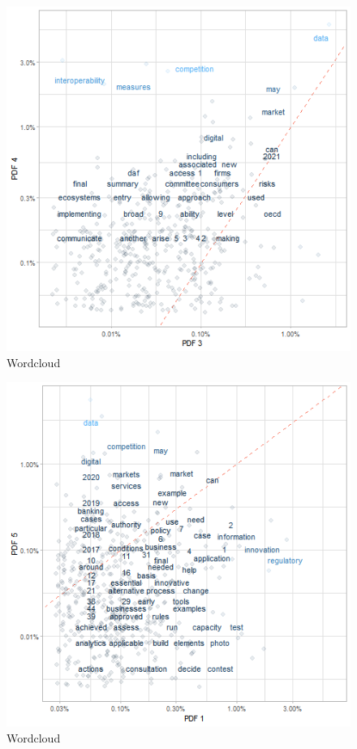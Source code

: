 \documentclass[
]{book}
\begin{document}
\begin{figure}

{\centering \includegraphics[width=0.8\linewidth]{img/p1p4} 

}

\caption{Wordcloud}\label{fig:nice-figjapN2-3}
\end{figure}
\begin{figure}

{\centering \includegraphics[width=0.8\linewidth]{img/p1p5} 

}

\caption{Wordcloud}\label{fig:nice-figjapN2-4}
\end{figure}
\end{document}
